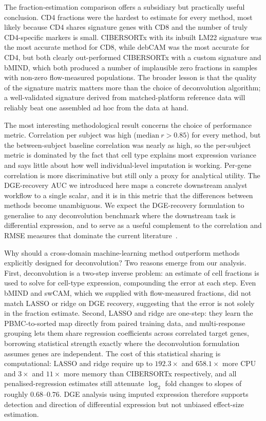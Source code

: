 \documentclass[11pt]{article}
\begin{document}
The fraction-estimation comparison offers a subsidiary but practically
useful conclusion. CD4 fractions were the hardest to estimate for
every method, most likely because CD4 shares signature genes with CD8
and the number of truly CD4-specific markers is small. CIBERSORTx
with its inbuilt LM22 signature was the most accurate method for CD8,
while debCAM was the most accurate for CD4, but both clearly
out-performed CIBERSORTx with a custom signature and bMIND, which both
produced a number of implausible zero fractions in samples with
non-zero flow-measured populations. The broader lesson is that the
quality of the signature matrix matters more than the choice of
deconvolution algorithm; a well-validated signature derived from
matched-platform reference data will reliably beat one assembled ad
hoc from the data at hand.

The most interesting methodological result concerns the choice of
performance metric. Correlation per subject was high ($\mathrm{median}\
r > 0.85$) for every method, but the between-subject baseline
correlation was nearly as high, so the per-subject metric is dominated
by the fact that cell type explains most expression variance and says
little about how well individual-level imputation is working. Per-gene
correlation is more discriminative but still only a proxy for
analytical utility. The DGE-recovery AUC we introduced here maps a
concrete downstream analyst workflow to a single scalar, and it is in
this metric that the differences between methods become
unambiguous. We expect the DGE-recovery formulation to generalise to
any deconvolution benchmark where the downstream task is differential
expression, and to serve as a useful complement to the correlation and
RMSE measures that dominate the current
literature~\citep{avilacobos2020benchmarking}.

Why should a cross-domain machine-learning method outperform methods
explicitly designed for deconvolution? Two reasons emerge from our
analysis. First, deconvolution is a two-step inverse problem: an
estimate of cell fractions is used to solve for cell-type expression,
compounding the error at each step. Even bMIND and swCAM, which we
supplied with flow-measured fractions, did not match LASSO or ridge on
DGE recovery, suggesting that the error is not solely in the fraction
estimate. Second, LASSO and ridge are one-step: they learn the
PBMC-to-sorted map directly from paired training data, and multi-response
grouping lets them share regression coefficients across correlated
target genes, borrowing statistical strength exactly where the deconvolution
formulation assumes genes are independent. The cost of this statistical
sharing is computational: LASSO and ridge require up to $192.3\times$
and $658.1\times$ more CPU and $3\times$ and $11\times$ more memory
than CIBERSORTx respectively, and all penalised-regression estimates
still attenuate $\log_{2}$ fold changes to slopes of roughly
$0.68$--$0.76$. DGE analysis using imputed expression therefore supports
detection and direction of differential expression but not unbiased
effect-size estimation.
\end{document}

